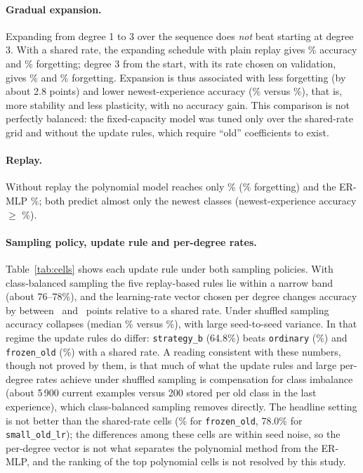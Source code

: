 \documentclass[11pt,a4paper]{article}
\begin{document}
\paragraph{Gradual expansion.} Expanding from degree 1 to 3 over the sequence does \emph{not} beat starting at degree 3. With a shared rate, the expanding schedule with plain replay gives \numCellOrdinaryCbSharedAcc\% accuracy and \numPolyTradeForg\% forgetting; degree 3 from the start, with its rate chosen on validation, gives \numPolyFixedCapAcc\% and \numPolyFixedCapForg\% forgetting. Expansion is thus associated with less forgetting (by about 2.8 points) and lower newest-experience accuracy (\numPolyTradeNew\% versus \numPolyFixedCapNew\%), that is, more stability and less plasticity, with no accuracy gain. This comparison is not perfectly balanced: the fixed-capacity model was tuned only over the shared-rate grid and without the update rules, which require ``old'' coefficients to exist.

\paragraph{Replay.} Without replay the polynomial model reaches only \numPolyNoReplayAcc\% (\numPolyNoReplayForg\% forgetting) and the ER-MLP \numErNoReplayAcc\%; both predict almost only the newest classes (newest-experience accuracy $\ge$ \numPolyNoReplayNew\%).

\paragraph{Sampling policy, update rule and per-degree rates.} Table~\ref{tab:cells} shows each update rule under both sampling policies. With class-balanced sampling the five replay-based rules lie within a narrow band (about 76--78\%), and the learning-rate vector chosen per degree changes accuracy by between \numPerDegreeGainCbMin\ and \numPerDegreeGainCbMax\ points relative to a shared rate. Under shuffled sampling accuracy collapses (median \numMedianShuffledAcc\% versus \numMedianClassBalancedAcc\%), with large seed-to-seed variance. In that regime the update rules do differ: \texttt{strategy\_b} (64.8\%) beats \texttt{ordinary} (\numCellOrdinaryShSharedAcc\%) and \texttt{frozen\_old} (\numCellFrozenOldShSharedAcc\%) with a shared rate. A reading consistent with these numbers, though not proved by them, is that much of what the update rules and large per-degree rates achieve under shuffled sampling is compensation for class imbalance (about 5\,900 current examples versus 200 stored per old class in the last experience), which class-balanced sampling removes directly. The headline setting is not better than the shared-rate cells (\numCellFrozenOldCbSharedAcc\% for \texttt{frozen\_old}, 78.0\% for \texttt{small\_old\_lr}); the differences among these cells are within seed noise, so the per-degree vector is not what separates the polynomial method from the ER-MLP, and the ranking of the top polynomial cells is not resolved by this study.
\end{document}
